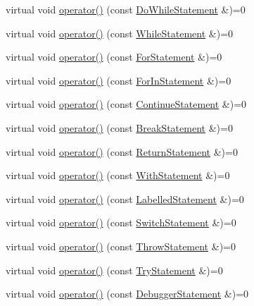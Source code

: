 \begin{DoxyCompactItemize}
virtual void \hyperlink{structast_1_1_visitor_a5968f66f615e62df8de1b2834b85a3c5}{operator()} (const \hyperlink{structast_1_1_do_while_statement}{Do\+While\+Statement} \&)=0
\item 
virtual void \hyperlink{structast_1_1_visitor_a6f641bd085be60607cdc9f81be46e94e}{operator()} (const \hyperlink{structast_1_1_while_statement}{While\+Statement} \&)=0
\item 
virtual void \hyperlink{structast_1_1_visitor_a514528028b44789d1c46e5a0ca072482}{operator()} (const \hyperlink{structast_1_1_for_statement}{For\+Statement} \&)=0
\item 
virtual void \hyperlink{structast_1_1_visitor_acdeb6ea294239c4cf0fb8315f56e6654}{operator()} (const \hyperlink{structast_1_1_for_in_statement}{For\+In\+Statement} \&)=0
\item 
virtual void \hyperlink{structast_1_1_visitor_a9f3cc6cc3a84f80fb7b45a364cfc47d3}{operator()} (const \hyperlink{structast_1_1_continue_statement}{Continue\+Statement} \&)=0
\item 
virtual void \hyperlink{structast_1_1_visitor_a499cf171502ada0a04d80df89658fb86}{operator()} (const \hyperlink{structast_1_1_break_statement}{Break\+Statement} \&)=0
\item 
virtual void \hyperlink{structast_1_1_visitor_a46efbfdf86d3d36bc88eda05b5284e45}{operator()} (const \hyperlink{structast_1_1_return_statement}{Return\+Statement} \&)=0
\item 
virtual void \hyperlink{structast_1_1_visitor_afcb8b75eb1322e469d948a7babb5195a}{operator()} (const \hyperlink{structast_1_1_with_statement}{With\+Statement} \&)=0
\item 
virtual void \hyperlink{structast_1_1_visitor_a642960b6d6941200c4e1efb9ef1425c4}{operator()} (const \hyperlink{structast_1_1_labelled_statement}{Labelled\+Statement} \&)=0
\item 
virtual void \hyperlink{structast_1_1_visitor_ac3974f9cab1df7051549833c94ea4900}{operator()} (const \hyperlink{structast_1_1_switch_statement}{Switch\+Statement} \&)=0
\item 
virtual void \hyperlink{structast_1_1_visitor_ab9ad6ba9ddd7634211b8850d6adcbae3}{operator()} (const \hyperlink{structast_1_1_throw_statement}{Throw\+Statement} \&)=0
\item 
virtual void \hyperlink{structast_1_1_visitor_a371172316d8785960396f7c425c079fa}{operator()} (const \hyperlink{structast_1_1_try_statement}{Try\+Statement} \&)=0
\item 
virtual void \hyperlink{structast_1_1_visitor_a6763b2cba87190ba1eb5e281a02390a8}{operator()} (const \hyperlink{structast_1_1_debugger_statement}{Debugger\+Statement} \&)=0

\end{DoxyCompactItemize}
